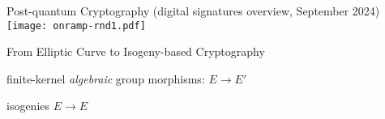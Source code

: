 \documentclass[aspectratio=169]{beamer}
\begin{document}

\begin{frame}{Post-quantum Cryptography \small(digital signatures overview, September 2024)}
  \centering
  \texttt{[image: onramp-rnd1.pdf]}
\end{frame}


\begin{frame}{From Elliptic Curve to Isogeny-based Cryptography}
  \Large
  \begin{description}
    \setlength{\itemsep}{4em}
  \item[Isogenies =] finite-kernel \textit{algebraic} group morphisms: \emph{$E \to E'$}
  \item[Endomorphisms =] isogenies \emph{$E \to E$}
  \end{description}
\end{frame}

\end{document}
